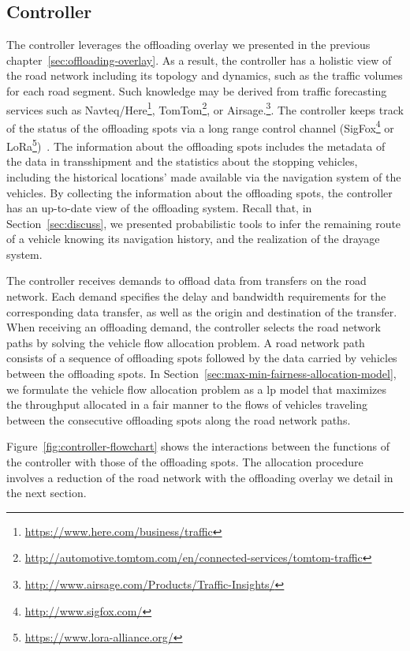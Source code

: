 \subsection{Controller}

The controller leverages the offloading overlay we presented in the previous chapter~\ref{sec:offloading-overlay}. As a result, the controller has a holistic view of the road network including its topology and dynamics, such as the traffic volumes for each road segment. Such knowledge may be derived from traffic forecasting services such as Navteq/Here\footnote{\url{https://www.here.com/business/traffic}},     
TomTom\footnote{\url{http://automotive.tomtom.com/en/connected-services/tomtom-traffic}}, or 
Airsage.\footnote{\url{http://www.airsage.com/Products/Traffic-Insights/}}. The controller keeps track of the status of the offloading spots via a long range control channel (\eg SigFox\footnote{\url{http://www.sigfox.com/}} or LoRa\footnote{\url{https://www.lora-alliance.org/}})~\cite{anteur2015ultra}. The information about the offloading spots includes the metadata of the data in transshipment and the statistics about the stopping vehicles, including the historical locations' made available via the navigation system of the vehicles. By collecting the information about the offloading spots, the controller has an up-to-date view of the offloading system. Recall that, in Section~\ref{sec:discuss}, we presented probabilistic tools to infer the remaining route of a vehicle knowing its navigation history, and the realization of the drayage system.

The controller receives demands to offload data from transfers on the road network. Each demand specifies the delay and bandwidth requirements for the corresponding data transfer, as well as the origin and destination of the transfer. When receiving an offloading demand, the controller selects the road network paths by solving the vehicle flow allocation problem. A road network path consists of a sequence of offloading spots followed by the data carried by vehicles between the offloading spots. In Section~\ref{sec:max-min-fairness-allocation-model}, we formulate the vehicle flow allocation problem as a \acrfull{lp} model that maximizes the throughput allocated in a fair manner to the flows of vehicles traveling between the consecutive offloading spots along the road network paths.

Figure~\ref{fig:controller-flowchart} shows the interactions between the functions of the controller with those of the offloading spots. The allocation procedure involves a reduction of the road network with the offloading overlay we detail in the next section. 

